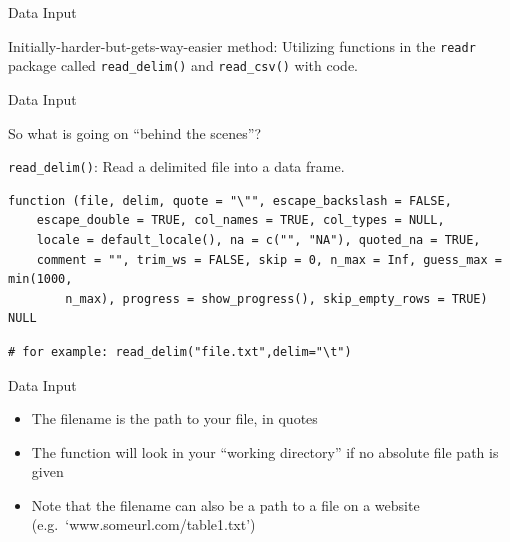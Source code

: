 \documentclass[
  ignorenonframetext,
]{beamer}
\providecommand{\tightlist}{%
  \setlength{\itemsep}{0pt}\setlength{\parskip}{0pt}}
\begin{document}
\begin{frame}[fragile]{Data Input}
\protect\hypertarget{data-input-4}{}

Initially-harder-but-gets-way-easier method: Utilizing functions in the
\texttt{readr} package called \texttt{read\_delim()} and
\texttt{read\_csv()} with code.

\end{frame}

\begin{frame}[fragile]{Data Input}
\protect\hypertarget{data-input-5}{}

So what is going on ``behind the scenes''?

\texttt{read\_delim()}: Read a delimited file into a data frame.

\begin{verbatim}
function (file, delim, quote = "\"", escape_backslash = FALSE, 
    escape_double = TRUE, col_names = TRUE, col_types = NULL, 
    locale = default_locale(), na = c("", "NA"), quoted_na = TRUE, 
    comment = "", trim_ws = FALSE, skip = 0, n_max = Inf, guess_max = min(1000, 
        n_max), progress = show_progress(), skip_empty_rows = TRUE) 
NULL
\end{verbatim}

\begin{verbatim}
# for example: read_delim("file.txt",delim="\t")
\end{verbatim}

\end{frame}

\begin{frame}{Data Input}
\protect\hypertarget{data-input-6}{}

\begin{itemize}
\tightlist
\item
  The filename is the path to your file, in quotes
\item
  The function will look in your ``working directory'' if no absolute
  file path is given
\item
  Note that the filename can also be a path to a file on a website
  (e.g.~`www.someurl.com/table1.txt')
\end{itemize}

\end{frame}
\end{document}
